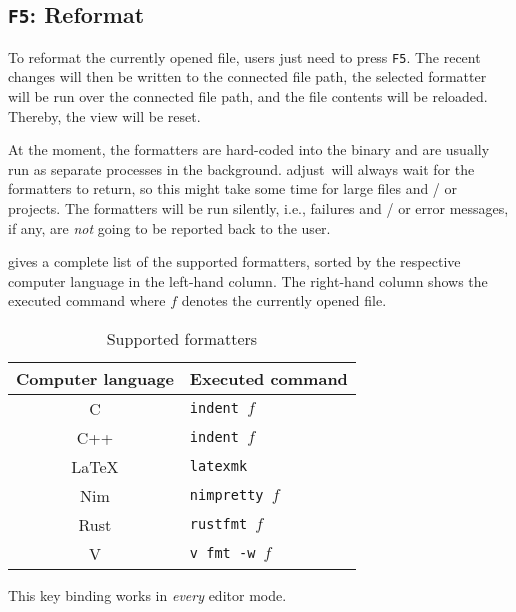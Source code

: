 \documentclass[11pt, a4paper, british]{scrartcl}
\DeclareRobustCommand{\adjust}{\textsf{adjust}}
\begin{document}
\subsection{\texttt{F5}:  Reformat}
\label{sec:f5-reformat}
To reformat the currently opened file, users just need to press \texttt{F5}.
The recent changes will then be written to the connected file path, the selected
formatter will be run over the connected file path, and the file contents will
be reloaded.  Thereby, the view will be reset.

At the moment, the formatters are hard-coded into the binary and are usually run
as separate processes in the background.  \adjust\ will always wait for the
formatters to return, so this might take some time for large files and / or
projects.  The formatters will be run silently, i.e., failures and / or error
messages, if any, are \emph{not} going to be reported back to the user.

 gives a complete list of the supported formatters, sorted
by the respective computer language in the left-hand column.  The right-hand
column shows the executed command where \texttt{$f$} denotes the currently opened
file.

\begin{table}
\centering
\caption{Supported formatters}
\label{tab:formatters}
\begin{tabular}{cl}
\toprule
Computer language   & Executed command          \\
\midrule
C                   & \texttt{indent $f$}       \\
C++                 & \texttt{indent $f$}       \\
\LaTeX              & \texttt{latexmk}          \\
Nim                 & \texttt{nimpretty $f$}    \\
Rust                & \texttt{rustfmt $f$}      \\
V                   & \texttt{v fmt -w $f$}     \\
\bottomrule
\end{tabular}
\end{table}

This key binding works in \emph{every} editor mode.

\end{document}
